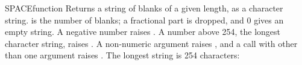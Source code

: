 \begin{XbaseEntry}{SPACE}{function}
Returns a string of blanks of a given length, as a character string.
\Syntax
{}
\Usage
{} is the number of blanks; a fractional part is dropped, and 0 gives an empty string. A negative number raises . A number above 254, the longest character string, raises . A non-numeric argument raises , and a call with other than one argument raises .
\Examples
{}
The longest string is 254 characters:
\end{XbaseEntry}

